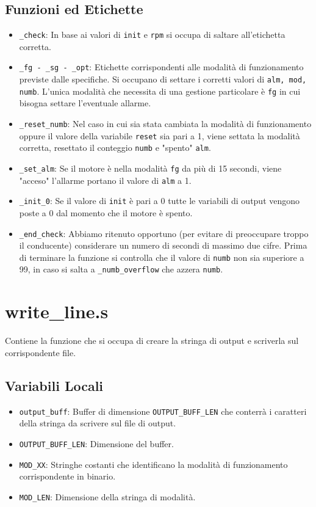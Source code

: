 \documentclass[a4paper,11pt]{article}
\newcommand{\itemtt}[1]{\item \texttt{#1}}
\begin{document}
	\subsection{Funzioni ed Etichette}
	\begin{itemize}
		\itemtt{\_check}: In base ai valori di \texttt{init} e \texttt{rpm} si occupa di saltare all'etichetta corretta. 
		\itemtt{\_fg - \_sg - \_opt}: Etichette corrispondenti alle modalità di funzionamento previste dalle specifiche. Si occupano di settare i corretti valori di \texttt{alm, mod, numb}. L'unica modalità che necessita di una gestione particolare è \texttt{fg} in cui bisogna settare l'eventuale allarme. 
		\itemtt{\_reset\_numb}: Nel caso in cui sia stata cambiata la modalità di funzionamento oppure il valore della variabile \texttt{reset} sia pari a 1, viene settata la modalità corretta, resettato il conteggio \texttt{numb} e "spento" \texttt{alm}.
		\itemtt{\_set\_alm}: Se il motore è nella modalità \texttt{fg} da più di 15 secondi, viene "acceso" l'allarme portano il valore di \texttt{alm} a 1.
		\itemtt{\_init\_0}: Se il valore di \texttt{init} è pari a 0 tutte le variabili di output vengono poste a 0 dal momento che il motore è spento. 
		\itemtt{\_end\_check}: Abbiamo ritenuto opportuno (per evitare di preoccupare troppo il conducente) considerare un numero di secondi di massimo due cifre. Prima di terminare la funzione si controlla che il valore di \texttt{numb} non sia superiore a 99, in caso si salta a \texttt{\_numb\_overflow} che azzera \texttt{numb}.
	\end{itemize}
	
	\section{write\_line.s}
	Contiene la funzione che si occupa di creare la stringa di output e scriverla sul corrispondente file. 
	\subsection{Variabili Locali}
		\begin{itemize}
			\itemtt{output\_buff}: Buffer di dimensione \texttt{OUTPUT\_BUFF\_LEN} che conterrà i caratteri della stringa da scrivere sul file di output.
			\itemtt{OUTPUT\_BUFF\_LEN}: Dimensione del buffer.
			\itemtt{MOD\_XX}: Stringhe costanti che identificano la modalità di funzionamento corrispondente in binario.
			\itemtt{MOD\_LEN}: Dimensione della stringa di modalità.
		\end{itemize}
	
\end{document}
